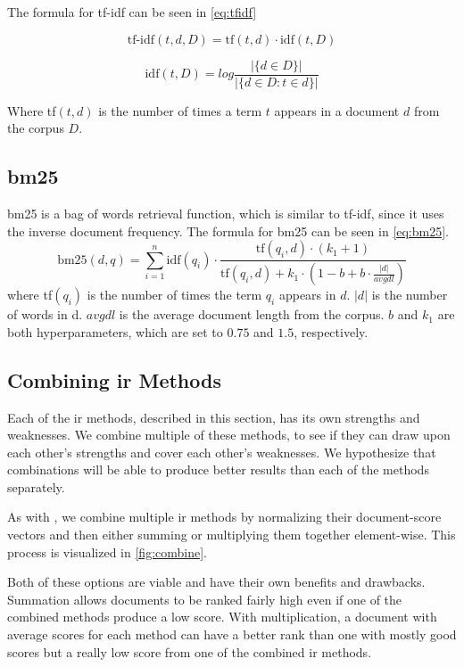The formula for \gls{tf-idf} can be seen in \autoref{eq:tfidf}

\begin{equation}\label{eq:tfidf}
	\text{tf-idf}(t, d, D) = \text{tf}(t, d) \cdot \text{idf}(t, D)
\end{equation}

\begin{equation}\label{eq:idf}
	\text{idf}(t,D) = log \frac{|\{d \in D\}|}{|\{d \in D : t \in d\}|}
\end{equation}
	
Where tf$(t, d)$ is the number of times a term $t$ appears in a document $d$ from the corpus $D$.

\subsection{\acrlong{bm25}}
\gls{bm25} is a bag of words retrieval function, which is similar to \gls{tf-idf}, since it uses the inverse document frequency.
The formula for \gls{bm25} can be seen in \autoref{eq:bm25}\cite{bm25}.
\begin{equation}\label{eq:bm25}
	\text{bm25}(d, q) = \sum_{i=1}^{n}\text{idf}(q_i) \cdot \frac{\text{tf}(q_i, d) \cdot (k_1 + 1)}{\text{tf}(q_i, d) + k_1 \cdot (1 - b + b \cdot \frac{|d|}{avgdl})}
\end{equation}
where tf$(q_i)$ is the number of times the term $q_i$ appears in $d$.
$|d|$ is the number of words in d. 
$avgdl$ is the average document length from the corpus.
$b$ and $k_1$ are both hyperparameters, which are set to $0.75$ and $1.5$, respectively.

\subsection{Combining \gls{ir} Methods}
Each of the \gls{ir} methods, described in this section, has its own strengths and weaknesses.
We combine multiple of these methods, to see if they can draw upon each other's strengths and cover each other's weaknesses.
We hypothesize that combinations will be able to produce better results than each of the methods separately.

As with \citet{yang2009topic}, we combine multiple \gls{ir} methods by normalizing their document-score vectors and then either summing or multiplying them together element-wise.
This process is visualized in \autoref{fig:combine}.



Both of these options are viable and have their own benefits and drawbacks.
Summation allows documents to be ranked fairly high even if one of the combined methods produce a low score.
With multiplication, a document with average scores for each method can have a better rank than one with mostly good scores but a really low score from one of the combined \gls{ir} methods.
